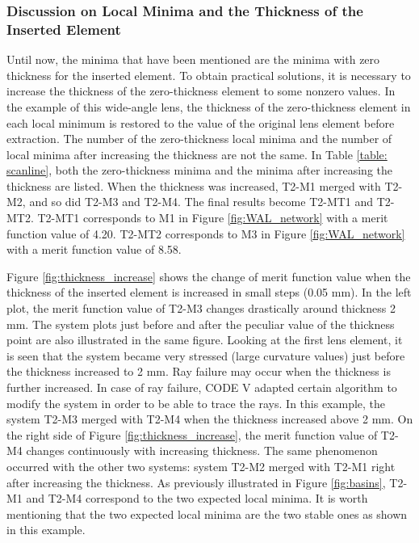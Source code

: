 \subsubsection{Discussion on Local Minima and the Thickness of the Inserted Element}
Until now, the minima that have been mentioned are the minima with zero thickness for the inserted element. To obtain practical solutions, it is necessary to increase the thickness of the zero-thickness element to some nonzero values. In the example of this wide-angle lens, the thickness of the zero-thickness element in each local minimum is restored to the value of the original lens element before extraction. The number of the zero-thickness local minima and the number of local minima after increasing the thickness are not the same. In Table \ref{table: scanline}, both the zero-thickness minima and the minima after increasing the thickness are listed. When the thickness was increased, T2-M1 merged with T2-M2, and so did T2-M3 and T2-M4. The final results become T2-MT1 and T2-MT2. T2-MT1 corresponds to M1 in Figure \ref{fig:WAL_network} with a merit function value of 4.20. T2-MT2 corresponds to M3 in Figure \ref{fig:WAL_network} with a merit function value of 8.58. 

Figure \ref{fig:thickness_increase} shows the change of merit function value when the thickness of the inserted element is increased in small steps (0.05 mm). In the left plot, the merit function value of T2-M3 changes drastically around thickness 2 mm. The system plots just before and after the peculiar value of  the thickness point are also illustrated in the same figure. Looking at the first lens element, it is seen that the system became very stressed (large curvature values) just before the thickness increased to 2 mm. Ray failure may occur when the thickness is further increased. In case of ray failure, CODE V adapted certain algorithm to modify the system in order to be able to trace the rays. In this example, the system T2-M3 merged with T2-M4 when the thickness increased above 2 mm. On the right side of Figure \ref{fig:thickness_increase}, the merit function value of T2-M4 changes continuously with increasing thickness. The same phenomenon occurred with the other two systems: system T2-M2 merged with T2-M1 right after increasing the thickness. As previously illustrated in Figure \ref{fig:basins}, T2-M1 and T2-M4 correspond to the two expected local minima. It is worth mentioning that the two expected local minima are the two stable ones as shown in this example.

